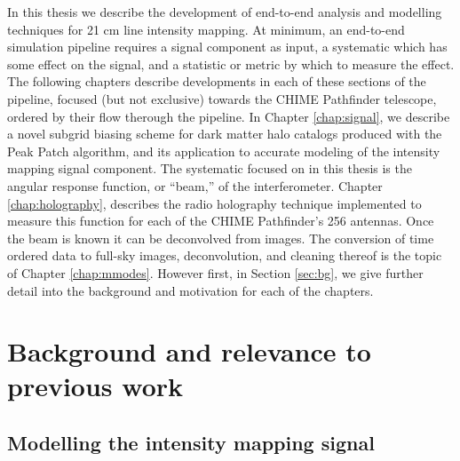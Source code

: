 In this thesis we describe the development of end-to-end analysis and modelling techniques for 21 cm line intensity mapping. At minimum, an end-to-end simulation pipeline requires a signal component as input, a systematic which has some effect on the signal, and a statistic or metric by which to measure the effect. The following chapters describe developments in each of these sections of the pipeline, focused (but not exclusive) towards the CHIME Pathfinder telescope, ordered by their flow therough the pipeline. In Chapter \ref{chap:signal}, we describe a novel subgrid biasing scheme for dark matter halo catalogs produced with the Peak Patch algorithm, and its application to accurate modeling of the intensity mapping signal component. The systematic focused on in this thesis is the angular response function, or ``beam,'' of the interferometer. Chapter \ref{chap:holography}, describes the radio holography technique implemented to measure this function for each of the CHIME Pathfinder's 256 antennas. Once the beam is known it can be deconvolved from images. The conversion of time ordered data to full-sky images, deconvolution, and cleaning thereof is the topic of Chapter \ref{chap:mmodes}. However first, in Section \ref{sec:bg}, we give further detail into the background and motivation for each of the chapters.

\section{\label{sec:bg} Background and relevance to previous work}

\subsection{\label{sec:bg:subsec:signal} Modelling the intensity mapping signal}

